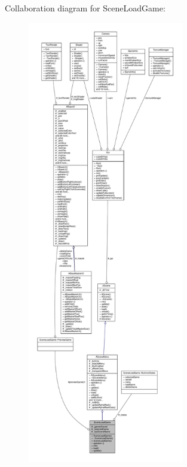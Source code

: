 Collaboration diagram for Scene\+Load\+Game\+:
\nopagebreak
\begin{figure}[H]
\begin{center}
\leavevmode
\includegraphics[height=550pt]{class_scene_load_game__coll__graph}
\end{center}
\end{figure}
